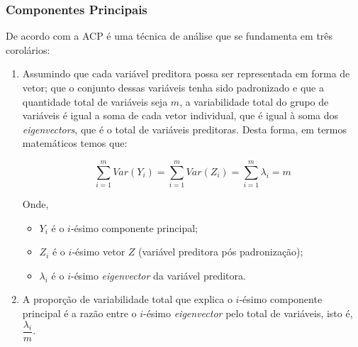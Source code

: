 \subsubsection{Componentes Principais}

De acordo com  a ACP é uma técnica de análise que se fundamenta em três corolários:

\begin{enumerate}
\item Assumindo que cada variável preditora possa ser representada em forma de vetor; que o conjunto dessas variáveis tenha sido padronizado e que a quantidade total de variáveis seja $m$, a variabilidade total do grupo de variáveis é igual a soma de cada vetor individual, que é igual à soma dos \textit{eigenvectors\footnotemark}, que é o total de variáveis preditoras. Desta forma, em termos matemáticos temos que:

\begin{equation}
\sum_{i=1}^m Var(Y_i) = \sum_{i=1}^m Var(Z_i) = \sum_{i=1}^m \lambda_i = m
\end{equation}

Onde,
\begin{itemize}[label={}]
\item $Y_i$ é o $i$-ésimo componente principal;
\item $Z_i$ é o $i$-ésimo vetor $Z$ (variável preditora pós padronização);
\item $\lambda_i$ é o $i$-ésimo \textit{eigenvector} da variável preditora.
\end{itemize}
\item A proporção de variabilidade total que explica o $i$-ésimo componente principal é a razão entre o $i$-ésimo \textit{eigenvector} pelo total de variáveis, isto é, $\dfrac{\lambda_i}{m}$.
\end{enumerate}

